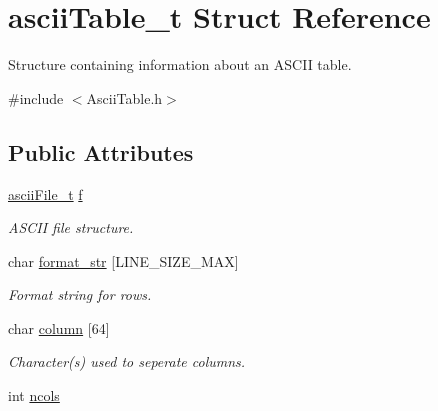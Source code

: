 \hypertarget{structasciiTable__t}{}\section{ascii\+Table\+\_\+t Struct Reference}
\label{structasciiTable__t}


Structure containing information about an A\+S\+C\+II table.  




{\ttfamily \#include $<$Ascii\+Table.\+h$>$}

\subsection*{Public Attributes}
\begin{DoxyCompactItemize}
\item 
\mbox{\label{structasciiTable__t_a1e211c26164429dca7a616e6a8af64a6}} 
\hyperlink{structasciiFile__t}{ascii\+File\+\_\+t} \hyperlink{structasciiTable__t_a1e211c26164429dca7a616e6a8af64a6}{f}
\begin{DoxyCompactList}\small\item\em A\+S\+C\+II file structure. \end{DoxyCompactList}\item 
\mbox{\label{structasciiTable__t_a030a09e49d0cb900ae0e3f6103229d14}} 
char \hyperlink{structasciiTable__t_a030a09e49d0cb900ae0e3f6103229d14}{format\+\_\+str} \mbox{[}L\+I\+N\+E\+\_\+\+S\+I\+Z\+E\+\_\+\+M\+AX\mbox{]}
\begin{DoxyCompactList}\small\item\em Format string for rows. \end{DoxyCompactList}\item 
\mbox{\label{structasciiTable__t_a4c09956acb7a76e0431d9deb6f27be7e}} 
char \hyperlink{structasciiTable__t_a4c09956acb7a76e0431d9deb6f27be7e}{column} \mbox{[}64\mbox{]}
\begin{DoxyCompactList}\small\item\em Character(s) used to seperate columns. \end{DoxyCompactList}\item 
\mbox{\label{structasciiTable__t_a837095bd2a245987e98f2bdd1fccaa94}} 
int \hyperlink{structasciiTable__t_a837095bd2a245987e98f2bdd1fccaa94}{ncols}

\end{DoxyCompactItemize}
